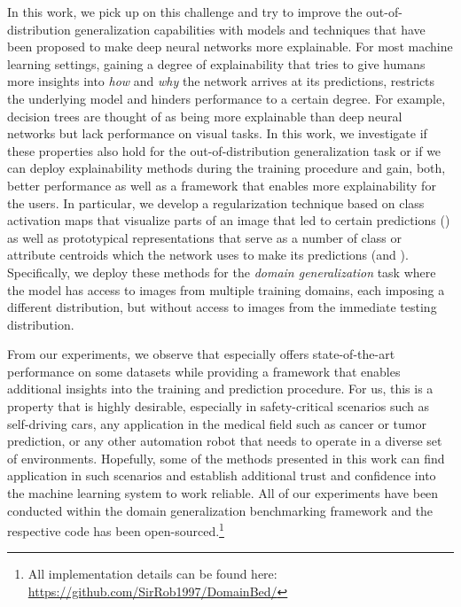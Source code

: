 In this work, we pick up on this challenge and try to improve the out-of-distribution generalization capabilities with models and techniques that have been proposed to make deep neural networks more explainable. For most machine learning settings, gaining a degree of explainability that tries to give humans more insights into \emph{how} and \emph{why} the network arrives at its predictions, restricts the underlying model and hinders performance to a certain degree. For example, decision trees are thought of as being more explainable than deep neural networks but lack performance on visual tasks. In this work, we investigate if these properties also hold for the out-of-distribution generalization task or if we can deploy explainability methods during the training procedure and gain, both, better performance as well as a framework that enables more explainability for the users. In particular, we develop a regularization technique based on class activation maps that visualize parts of an image that led to certain predictions (\divcam) as well as prototypical representations that serve as a number of class or attribute centroids which the network uses to make its predictions (\prodrop and \dtransformers). Specifically, we deploy these methods for the \emph{domain generalization} task where the model has access to images from multiple training domains, each imposing a different distribution, but without access to images from the immediate testing distribution.

From our experiments, we observe that especially \divcam offers state-of-the-art performance on some datasets while providing a framework that enables additional insights into the training and prediction procedure. For us, this is a property that is highly desirable, especially in safety-critical scenarios such as self-driving cars, any application in the medical field such as cancer or tumor prediction, or any other automation robot that needs to operate in a diverse set of environments. Hopefully, some of the methods presented in this work can find application in such scenarios and establish additional trust and confidence into the machine learning system to work reliable. All of our experiments have been conducted within the \domainbed domain generalization benchmarking framework and the respective code has been open-sourced.\footnote{All implementation details can be found here: \url{https://github.com/SirRob1997/DomainBed/}}  












